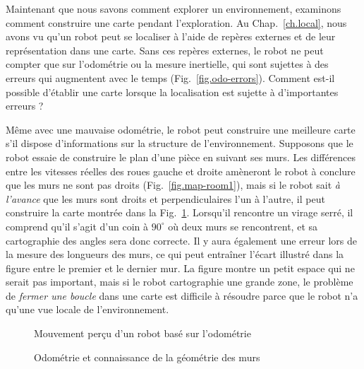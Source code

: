 Maintenant que nous savons comment explorer un environnement, examinons comment construire une carte pendant l'exploration. Au Chap.~\ref{ch.local}, nous avons vu qu'un robot peut se localiser à l'aide de repères externes et de leur représentation dans une carte. Sans ces repères externes, le robot ne peut compter que sur l'odométrie ou la mesure inertielle, qui sont sujettes à des erreurs qui augmentent avec le temps (Fig.~\ref{fig.odo-errors}). Comment est-il possible d'établir une carte lorsque la localisation est sujette à d'importantes erreurs ?

Même avec une mauvaise odométrie, le robot peut construire une meilleure carte s'il dispose d'informations sur la structure de l'environnement. Supposons que le robot essaie de construire le plan d'une pièce en suivant ses murs. Les différences entre les vitesses réelles des roues gauche et droite amèneront le robot à conclure que les murs ne sont pas droits (Fig.~\ref{fig.map-room1}), mais si le robot sait \emph{à l'avance} que les murs sont droits et perpendiculaires l'un à l'autre, il peut construire la carte montrée dans la Fig.~\ref{fig.map-room2}. Lorsqu'il rencontre un virage serré, il comprend qu'il s'agit d'un coin à $90^\circ$ où deux murs se rencontrent, et sa cartographie des angles sera donc correcte. Il y aura également une erreur lors de la mesure des longueurs des murs, ce qui peut entraîner l'écart illustré dans la figure entre le premier et le dernier mur. La figure montre un petit espace qui ne serait pas important, mais si le robot cartographie une grande zone, le problème de \emph{fermer une boucle} dans une carte est difficile à résoudre parce que le robot n'a qu'une vue locale de l'environnement.

\begin{figure}
\begin{minipage}{.45\textwidth}
\caption{Mouvement perçu d'un robot basé sur l'odométrie}
\label{fig.map-room1}
\end{minipage}
\hspace{\fill}
\begin{minipage}{.45\textwidth}
\caption{Odométrie et connaissance de la géométrie des murs}
\label{fig.map-room2}
\end{minipage}
\end{figure}

